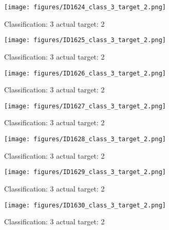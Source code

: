 \begin{figure}[h!]
\begin{center}
\texttt{[image: figures/ID1624\_class\_3\_target\_2.png]}
\end{center}
\caption{ Classification: 3 actual target: 2}
\label{fig:ID1624_class_3_target_2}
\end{figure}
\begin{figure}[h!]
\begin{center}
\texttt{[image: figures/ID1625\_class\_3\_target\_2.png]}
\end{center}
\caption{ Classification: 3 actual target: 2}
\label{fig:ID1625_class_3_target_2}
\end{figure}
\begin{figure}[h!]
\begin{center}
\texttt{[image: figures/ID1626\_class\_3\_target\_2.png]}
\end{center}
\caption{ Classification: 3 actual target: 2}
\label{fig:ID1626_class_3_target_2}
\end{figure}
\begin{figure}[h!]
\begin{center}
\texttt{[image: figures/ID1627\_class\_3\_target\_2.png]}
\end{center}
\caption{ Classification: 3 actual target: 2}
\label{fig:ID1627_class_3_target_2}
\end{figure}
\begin{figure}[h!]
\begin{center}
\texttt{[image: figures/ID1628\_class\_3\_target\_2.png]}
\end{center}
\caption{ Classification: 3 actual target: 2}
\label{fig:ID1628_class_3_target_2}
\end{figure}
\begin{figure}[h!]
\begin{center}
\texttt{[image: figures/ID1629\_class\_3\_target\_2.png]}
\end{center}
\caption{ Classification: 3 actual target: 2}
\label{fig:ID1629_class_3_target_2}
\end{figure}
\begin{figure}[h!]
\begin{center}
\texttt{[image: figures/ID1630\_class\_3\_target\_2.png]}
\end{center}
\caption{ Classification: 3 actual target: 2}
\label{fig:ID1630_class_3_target_2}
\end{figure}
